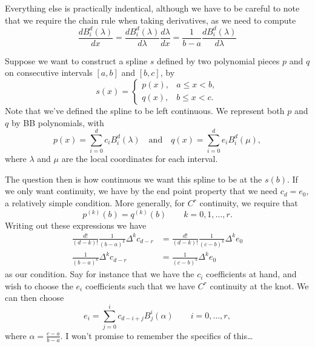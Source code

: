 Everything else is practically indentical, although we have to be careful to note that we require the chain rule when taking derivatives, as we need to compute
\begin{equation}
    \frac{d B_i^d(\lambda)}{dx} = \frac{d B_i^d(\lambda)}{d\lambda} \frac{d\lambda}{dx} = \frac{1}{b - a} \frac{d B_i^d(\lambda)}{d\lambda}
\end{equation}

Suppose we want to construct a spline $s$ defined by two polynomial pieces $p$ and $q$ on consecutive intervals $[a, b]$ and $[b, c]$, by
\begin{equation}
    s(x) =
    \begin{cases}
        p(x), & a \leq x < b, \\
        q(x), & b \leq x < c.
    \end{cases}
\end{equation}
Note that we've defined the spline to be left continuous.
We represent both $p$ and $q$ by BB polynomials, with
\begin{equation}
    p(x) = \sum_{i = 0}^{d} c_i B_i^d(\lambda)
    \quad\text{and}\quad
    q(x) = \sum_{i = 0}^{d} e_i B_i^d(\mu),
\end{equation}
where $\lambda$ and $\mu$ are the local coordinates for each interval.

The question then is how continuous we want this spline to be at the $s(b)$.
If we only want continuity, we have by the end point property that we need $c_d = e_0$, a relatively simple condition.
More generally, for $C^r$ continuity, we require that
\begin{equation}
    p^{(k)}(b) = q^{(k)}(b)
    \qquad
    k = 0, 1, \dots, r.
\end{equation}
Writing out these expressions we have
\begin{align*}
    \frac{d!}{(d - k)!} \frac{1}{(b - a)^k} \Delta^k c_{d-r} &= \frac{d!}{(d - k)!} \frac{1}{(c - b)^k} \Delta^k e_{0} \\
    \frac{1}{(b - a)^k} \Delta^k c_{d-r} &= \frac{1}{(c - b)^k} \Delta^k e_{0}
\end{align*}
as our condition.
Say for instance that we have the $c_i$ coefficients at hand, and wish to choose the $e_i$ coefficients such that we have $C^r$ continuity at the knot.
We can then choose
\begin{equation}
    e_i = \sum_{j = 0}^{i} c_{d - i + j} B_j^i(\alpha)
    \qquad i = 0, \dots, r,
\end{equation}
where $\alpha = \frac{c - a}{b - a}$.
I won't promise to remember the specifics of this\dots

